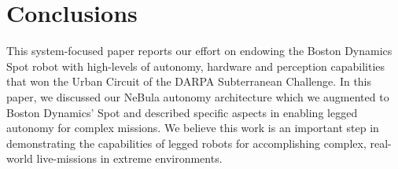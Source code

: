 \documentclass[letterpaper, 10pt, conference]{ieeeconf}      %
\begin{document}





\section{Conclusions}\label{sec:conclusions}

This system-focused paper reports our effort on endowing the Boston Dynamics Spot robot with high-levels of autonomy, hardware and perception capabilities that won the Urban Circuit of the DARPA Subterranean Challenge.
In this paper, we discussed our NeBula autonomy architecture which we augmented to Boston Dynamics' Spot and described specific aspects in enabling legged autonomy for complex missions.  
We believe this work is an important step in demonstrating the capabilities of legged robots for accomplishing complex, real-world live-missions in extreme environments.
\end{document}
